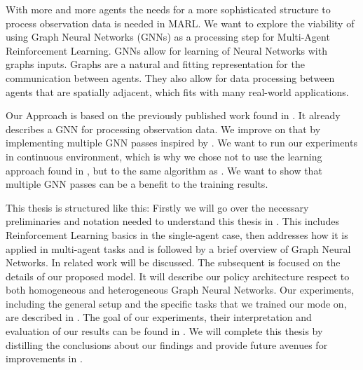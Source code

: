 With more and more agents the needs for a more sophisticated structure to process observation data is needed in MARL. We want to explore the viability of using Graph Neural Networks (GNNs) as a processing step for Multi-Agent Reinforcement Learning. GNNs allow for learning of Neural Networks with graphs inputs. Graphs are a natural and fitting representation for the communication between agents. They also allow for data processing between agents that are spatially adjacent, which fits with many real-world applications. \par

Our Approach is based on the previously published work found in \citet{RobinRuede2021}. It already describes a GNN for processing observation data. We improve on that by implementing multiple GNN passes inspired by \citet{graphconvolutionMARL}. We want to run our experiments in continuous environment, which is why we chose not to use the learning approach found in \citet{graphconvolutionMARL}, but to the same algorithm as \citet{RobinRuede2021}. We want to show that multiple GNN passes can be a benefit to the training results.\par


This thesis is structured like this: Firstly we will go over the necessary preliminaries and notation needed to understand this thesis in . This includes Reinforcement Learning basics in the single-agent case, then addresses how it is applied in multi-agent tasks and is followed by a brief overview of Graph Neural Networks. In  related work will be discussed. The subsequent  is focused on the details of our proposed model. It will describe our policy architecture respect to both homogeneous and heterogeneous Graph Neural Networks. Our experiments, including the general setup and the specific tasks that we trained our mode on, are described in . The goal of our experiments, their interpretation and evaluation of our results can be found in . We will complete this thesis by distilling the conclusions about our findings and provide future avenues for improvements in . 